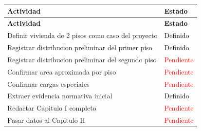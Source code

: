 \documentclass[12pt,a4paper]{article}
\newcommand{\pendiente}{\textcolor{red}{Pendiente}}
\newcommand{\ok}{\textcolor{green!50!black}{Definido}}
\begin{document}
\begin{longtable}{L{9cm}L{3.8cm}}
\toprule
\textbf{Actividad} & \textbf{Estado} \\
\midrule
\endfirsthead
\toprule
\textbf{Actividad} & \textbf{Estado} \\
\midrule
\endhead
Definir vivienda de 2 pisos como caso del proyecto & \ok \\
Registrar distribucion preliminar del primer piso & \ok \\
Registrar distribucion preliminar del segundo piso & \pendiente \\
Confirmar area aproximada por piso & \pendiente \\
Confirmar cargas especiales & \pendiente \\
Extraer evidencia normativa inicial & \ok \\
Redactar Capitulo I completo & \pendiente \\
Pasar datos al Capitulo II & \pendiente \\
\bottomrule
\end{longtable}
\end{document}
